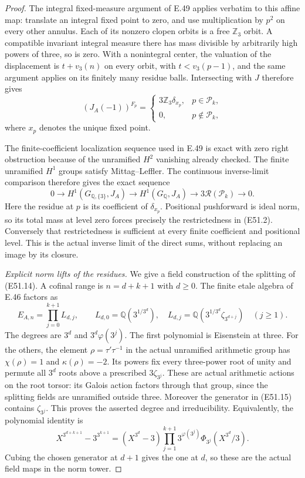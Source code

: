\begin{proof}
The integral fixed-measure argument of E.49
applies verbatim to this affine map: translate
an integral fixed point to zero, and use
multiplication by $p^2$ on every other annulus.
Each of its nonzero clopen orbits is a free
$\mathbb Z_3$ orbit. A compatible invariant
integral measure there has mass divisible
by arbitrarily high powers of three, so is
zero. With a nonintegral center, the valuation
of the displacement is $t+v_3(n)$ on every
orbit, with $t<v_3(p-1)$, and the same argument
applies on its finitely many residue balls.
Intersecting with $J$ therefore gives
\[
 (J_A(-1))^{F_p}=
 \begin{cases}
 3\mathbb Z_3\delta_{x_p},&p\in\mathscr P_k,\\
 0,&p\notin\mathscr P_k,
 \end{cases}
 \tag{E51.13}
\]
where $x_p$ denotes the unique fixed point.

The finite-coefficient localization sequence
used in E.49 is exact with zero right obstruction
because of the unramified $H^2$ vanishing already
checked. The finite unramified $H^1$ groups
satisfy Mittag--Leffler. The continuous
inverse-limit comparison therefore gives
the exact sequence
\[
 0\longrightarrow H^1(G_{\mathbb Q,\{3\}},J_A)
 \longrightarrow H^1(G_{\mathbb Q},J_A)
 \longrightarrow 3\mathcal R(\mathscr P_k)
 \longrightarrow0 .                                      \tag{E51.14}
\]
Here the residue at $p$ is its coefficient
of $\delta_{x_p}$. Positional pushforward
is ideal norm, so its total mass at level
zero forces precisely the restrictedness
in (E51.2). Conversely that restrictedness
is sufficient at every finite coefficient
and positional level. This is the actual
inverse limit of the direct sums, without
replacing an image by its closure.

\emph{Explicit norm lifts of the residues.}
We give a field construction of the splitting
of (E51.14). A cofinal range is $n=d+k+1$
with $d\ge0$. The finite etale algebra of
E.46 factors as
\[
 E_{A,n}=\prod_{j=0}^{k+1} L_{d,j},\qquad
 L_{d,0}=\mathbb Q(3^{1/3^d}),\quad
 L_{d,j}=\mathbb Q(3^{1/3^d}\zeta_{3^{d+j}})
                                  \quad(j\ge1).
 \tag{E51.15}
\]
The degrees are $3^d$ and $3^d\varphi(3^j)$.
The first polynomial is Eisenstein at three.
For the others, the element $\rho=\tau'\tau^{-1}$
in the actual unramified arithmetic group
has $\chi(\rho)=1$ and $\kappa(\rho)=-2$.
Its powers fix every three-power root of unity and
permute all $3^d$ roots above a prescribed
$3\zeta_{3^j}$. These are actual arithmetic
actions on the root torsor: its Galois
action factors through that group, since
the splitting fields are unramified outside
three. Moreover the generator in (E51.15)
contains $\zeta_{3^j}$. This proves the
asserted degree and irreducibility. Equivalently,
the polynomial identity is
\[
 X^{3^{d+k+1}}-3^{3^{k+1}}
  =(X^{3^d}-3)
       \prod_{j=1}^{k+1}
       3^{\varphi(3^j)}
               \Phi_{3^j}(X^{3^d}/3).
 \tag{E51.16}
\]
Cubing the chosen generator at $d+1$ gives
the one at $d$, so these are the actual
field maps in the norm tower.


\end{proof}
